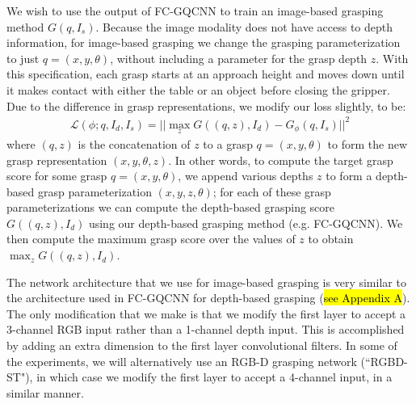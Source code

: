 We wish to use the output of FC-GQCNN to train an image-based grasping method  $G(q, I_s)$.  Because the image modality does not have access to depth information, for image-based grasping we change the grasping parameterization to just $q = (x, y, \theta)$, without including a parameter for the grasp depth $z$.  With this specification, each grasp starts at an approach height and moves down until it makes contact with either the table or an object before closing the gripper.  Due to the difference in grasp representations, we modify our loss slightly, to be:
\begin{align}
    \mathcal{L}(\phi; q, I_d, I_s) = ||\max_z G((q, z), I_d) - G_\phi(q, I_s)||^2
\end{align}
where $(q, z)$ is the concatenation of $z$ to a grasp $q = (x, y, \theta)$ to form the new grasp representation $(x, y, \theta, z)$. In other words, to compute the target grasp score for some grasp $q = (x, y, \theta)$, we append various depths $z$ to form a depth-based grasp parameterization $(x, y, z, \theta)$; for each of these grasp parameterizations we can compute the depth-based grasping score $G((q, z), I_d)$ using our depth-based grasping method (e.g. FC-GQCNN).  We then compute the maximum grasp score over the values of $z$ to obtain $\max_z G((q, z), I_d)$.

The network architecture that we use for image-based grasping is very similar to the architecture used in FC-GQCNN for depth-based grasping (\hl{see Appendix A}).  The only modification that we make is that we modify the first layer to accept a 3-channel RGB input rather than a 1-channel depth input. This is accomplished by adding an extra dimension to the first layer convolutional filters. In some of the experiments, we will alternatively use an RGB-D grasping network (``RGBD-ST"), in which case we modify the first layer to accept a 4-channel input, in a similar manner.

